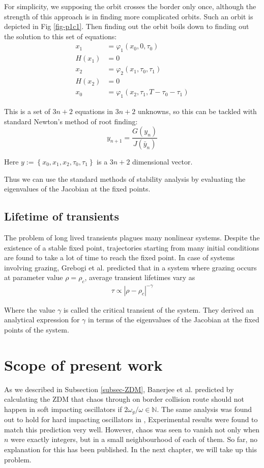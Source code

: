 \documentclass{book}
\renewcommand{\(}{\begin{columns}}
\renewcommand{\)}{\end{columns}}
\newcommand{\<}[1]{\begin{column}{#1}}
\renewcommand{\>}{\end{column}}
\begin{document}
For simplicity, we supposing the orbit crosses the border only once, although 
the strength of this approach is in finding more complicated orbits.  Such an 
orbit is depicted in Fig \ref{fig-p1c1}.
Then finding out the orbit boils down to finding out the solution to this set 
of equations:
\begin{align}
x_1&=\varphi_1(x_0,0,\tau_0)\\
H(x_1)&=0\\
x_2&=\varphi_2(x_1,\tau_0,\tau_1)\\
H(x_2)&=0\\
x_0&=\varphi_1(x_2,\tau_1,T-\tau_0-\tau_1)
\end{align}


This is a set of $3n+2$ equations in $3n+2$ unknowns, so this can be tackled 
with standard Newton's method of root finding:
\[
y_{n+1}=\frac{G(y_n)}{J(\bar{y}_n)}
\]

Here $y:=\left\{x_0,x_1,x_2,\tau_0,\tau_1\right\}$ is a $3n+2$ dimensional 
vector.  

Thus we can use the standard methods of stability analysis by evaluating the 
eigenvalues of the Jacobian at the fixed points.  

\subsection{Lifetime of transients}
The problem of long lived transients plagues many nonlinear systems. Despite 
the existence of a stable fixed point, trajectories starting from many initial 
conditions are found to take a lot of time to reach the fixed point.  In case 
of systems involving grazing, Grebogi et al.\cite{grebogi-transient} predicted 
that in a system where grazing occurs at parameter value $\rho=\rho_c$, 
average transient lifetimes vary as
\begin{align}
\label{form-transient-life}
\tau\propto |\rho-\rho_c|^{-\gamma}
\end{align}

Where the value $\gamma$ is called the critical transient of the system.  They 
derived an analytical expression for $\gamma$ in terms of the eigenvalues of 
the Jacobian at the fixed points of the system.  

\section{Scope of present work}
As we described in Subsection \ref{subsec-ZDM}, Banerjee et al. predicted by 
calculating the ZDM that 
chaos through on border collision route should not happen in soft impacting 
oscillators if $2\omega_g/\omega\in\mathbb{N}$.  The same analysis was found out 
to hold for hard impacting oscillators in \cite{banerjee-kundu-hard}, Experimental results were found 
to match this prediction very well. However, chaos was seen to vanish not only when $n$ were exactly 
integers, but in a small neighbourhood of each of them.  So far, no 
explanation for this has been published.  In the next chapter, we will 
take up this problem.  
\end{document}
